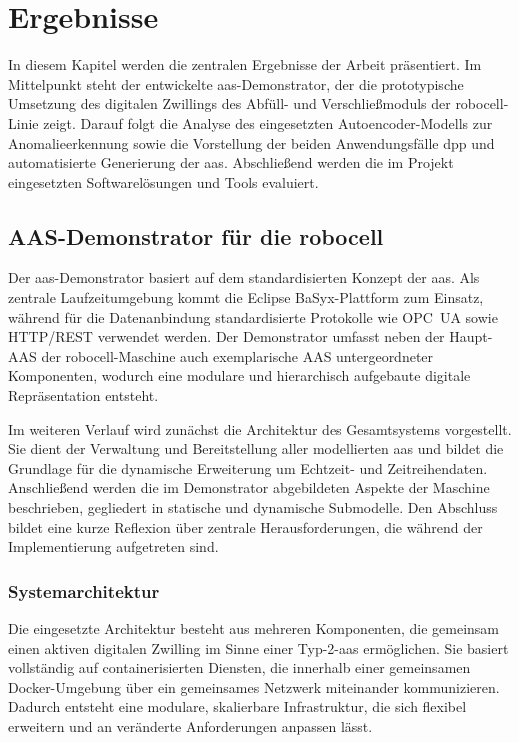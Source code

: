\newpage
\section{Ergebnisse}
\label{sec:Ergebnisse}
In diesem Kapitel werden die zentralen Ergebnisse der Arbeit präsentiert.
Im Mittelpunkt steht der entwickelte \acs{aas}-Demonstrator, der die prototypische Umsetzung des digitalen Zwillings des Abfüll- und Verschließmoduls der robocell-Linie zeigt.
Darauf folgt die Analyse des eingesetzten Autoencoder-Modells zur Anomalieerkennung sowie die Vorstellung der beiden Anwendungsfälle \acs{dpp} und automatisierte Generierung der \acs{aas}.
Abschließend werden die im Projekt eingesetzten Softwarelösungen und Tools evaluiert.

\subsection{AAS-Demonstrator für die robocell}
\label{sec:AAS-Demonstrator}
Der \acs{aas}-Demonstrator basiert auf dem standardisierten Konzept der \acs{aas}.
Als zentrale Laufzeitumgebung kommt die Eclipse BaSyx-Plattform zum Einsatz, während für die Datenanbindung standardisierte Protokolle wie OPC~UA sowie HTTP/REST verwendet werden.
Der Demonstrator umfasst neben der Haupt-AAS der robocell-Maschine auch exemplarische AAS untergeordneter Komponenten, wodurch eine modulare und hierarchisch aufgebaute digitale Repräsentation entsteht.

Im weiteren Verlauf wird zunächst die Architektur des Gesamtsystems vorgestellt.
Sie dient der Verwaltung und Bereitstellung aller modellierten \acs{aas} und bildet die Grundlage für die dynamische Erweiterung um Echtzeit- und Zeitreihendaten.
Anschließend werden die im Demonstrator abgebildeten Aspekte der Maschine beschrieben, gegliedert in statische und dynamische Submodelle.
Den Abschluss bildet eine kurze Reflexion über zentrale Herausforderungen, die während der Implementierung aufgetreten sind.

\subsubsection{Systemarchitektur}
Die eingesetzte Architektur besteht aus mehreren Komponenten, die gemeinsam einen aktiven digitalen Zwilling im Sinne einer Typ-2-\acs{aas} ermöglichen.
Sie basiert vollständig auf containerisierten Diensten, die innerhalb einer gemeinsamen Docker-Umgebung über ein gemeinsames Netzwerk miteinander kommunizieren.
Dadurch entsteht eine modulare, skalierbare Infrastruktur, die sich flexibel erweitern und an veränderte Anforderungen anpassen lässt.

